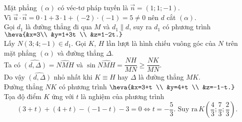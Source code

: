 \begin{ex}
{		Mặt phẳng $(\alpha)$ có véc-tơ  pháp tuyến là $\vec{n}=(1; 1;-1)$.\\
		Vì $\vec{u} \cdot \vec{n}=0\cdot 1+3\cdot 1+(-2) \cdot(-1)=5\neq 0$ nên $d$ cắt $(\alpha)$.\\
		Gọi $d_1$ là đường thẳng đi qua $M$ và $d_1 \parallel d$, suy ra $d_1$ có phương trình $\heva{&x=3\\
			&y=1+3t \\
			&z=1-2t.}$\\
		Lấy $N(3; 4;-1) \in d_1$. Gọi $K$, $H$ lần lượt là hình chiếu vuông góc của $N$ trên mặt phẳng $(\alpha)$ và đường thẳng $\Delta$.\\		
		Ta có $\widehat{(d, \Delta)}=\widehat{NMH}$ và $\sin \widehat{NMH}=\dfrac{NH}{MN} \geq \dfrac{NK}{MN}$.\\		
		Do vậy $\widehat{(d, \Delta)}$ nhỏ nhất khi $K\equiv H$ hay $\Delta$ là đường thẳng $MK$.\\
		Đường thẳng $NK$ có phương trình $\heva{&x=3+t \\
			&y=4+t \\
			&z=-1-t.}$\\
		Tọa độ điểm $K$ ứng với $t$ là nghiệm của phương trình
		$$(3+t)+(4+t)-(-1-t)-3=0 \Leftrightarrow t=-\dfrac{5}{3} \text {. Suy ra}\, K\left(\dfrac{4}{3}; \dfrac{7}{3}; \dfrac{2}{3}\right).	$$
	}
\end{ex}

